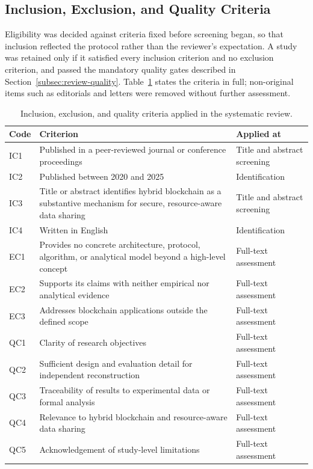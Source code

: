 \subsection{Inclusion, Exclusion, and Quality Criteria}
\label{subsec:review-criteria}

Eligibility was decided against criteria fixed before screening began, so that
inclusion reflected the protocol rather than the reviewer's expectation. A study
was retained only if it satisfied every inclusion criterion and no exclusion
criterion, and passed the mandatory quality gates described in
Section~\ref{subsec:review-quality}. Table~\ref{tab:review-criteria} states the
criteria in full; non-original items such as editorials and letters were removed
without further assessment.

\begin{table}[!htbp]
\centering
\footnotesize
\setlength{\tabcolsep}{4pt}
\renewcommand{\arraystretch}{1.3}
\caption{Inclusion, exclusion, and quality criteria applied in the systematic review.}
\label{tab:review-criteria}
\begin{tabularx}{\textwidth}{@{}
    >{\raggedright\arraybackslash}p{1.0cm}
    >{\raggedright\arraybackslash}X
    >{\raggedright\arraybackslash}p{3.2cm}@{}}
\toprule
\textbf{Code} & \textbf{Criterion} & \textbf{Applied at} \\
\midrule
IC1 & Published in a peer-reviewed journal or conference proceedings & Title and abstract screening \\
IC2 & Published between 2020 and 2025 & Identification \\
IC3 & Title or abstract identifies hybrid blockchain as a substantive mechanism for secure, resource-aware data sharing & Title and abstract screening \\
IC4 & Written in English & Identification \\
\midrule
EC1 & Provides no concrete architecture, protocol, algorithm, or analytical model beyond a high-level concept & Full-text assessment \\
EC2 & Supports its claims with neither empirical nor analytical evidence & Full-text assessment \\
EC3 & Addresses blockchain applications outside the defined scope & Full-text assessment \\
\midrule
QC1 & Clarity of research objectives & Full-text assessment \\
QC2 & Sufficient design and evaluation detail for independent reconstruction & Full-text assessment \\
QC3 & Traceability of results to experimental data or formal analysis & Full-text assessment \\
QC4 & Relevance to hybrid blockchain and resource-aware data sharing & Full-text assessment \\
QC5 & Acknowledgement of study-level limitations & Full-text assessment \\
\bottomrule
\end{tabularx}
\end{table}

